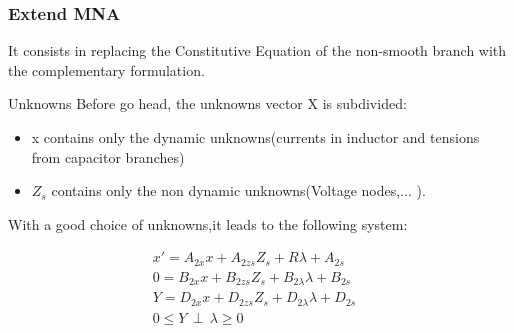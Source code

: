 
\frame
{
\frametitle{Extend MNA}
 It consists in replacing the Constitutive Equation of the non-smooth branch with the complementary
 formulation.

 \begin{block}{Unknowns}
 Before go head, the unknowns vector X is subdivided:
\begin{itemize}
\item x contains only the dynamic unknowns(currents in inductor and tensions from capacitor branches)
\item $Z_{s}$ contains only the non dynamic unknowns(Voltage nodes,... ).
\end{itemize}
  \end{block}
  
 \begin{block}{With a good choice of unknowns,it leads to the following system:}
 
 \begin{eqnarray}
x'=A_{2x}x +A_{2zs}Z_{s} +R \lambda +A_{2s}&\label{eq2}\\
0=B_{2x}x+B_{2zs}Z_{s} + B_{2\lambda}\lambda + B_{2s}&\label{eq3}\\
Y=D_{2x}x+D_{2zs}Z_{s}+D_{2\lambda}\lambda + D_{2s} &\label{eq4}\\
0 \leq Y \, \perp \, \lambda \geq 0&\label{eqperp}
\end{eqnarray}

  \end{block}


}
